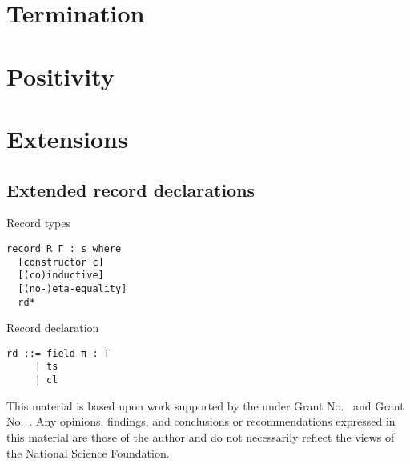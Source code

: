 \documentclass[acmlarge]{acmart}\settopmatter{}
\begin{document}
\section{Termination}
\label{sec:termination}

\section{Positivity}
\label{sec:positivity}

\section{Extensions}
\label{sec:extensions}

\subsection{Extended record declarations}

Record types
\begin{verbatim}
record R Γ : s where
  [constructor c]
  [(co)inductive]
  [(no-)eta-equality]
  rd*
\end{verbatim}

Record declaration
\begin{verbatim}
rd ::= field π : T
     | ts
     | cl 
\end{verbatim}


\begin{acks}                            %
  This material is based upon work supported by the
   under Grant
  No.~ and Grant
  No.~.  Any opinions, findings, and
  conclusions or recommendations expressed in this material are those
  of the author and do not necessarily reflect the views of the
  National Science Foundation.
\end{acks}


%


\end{document}
